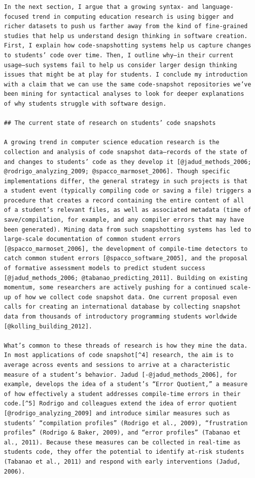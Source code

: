 \begin{verbatim}
In the next section, I argue that a growing syntax- and language-focused trend in computing education research is using bigger and richer datasets to push us farther away from the kind of fine-grained studies that help us understand design thinking in software creation. First, I explain how code-snapshotting systems help us capture changes to students’ code over time. Then, I outline why—in their current usage—such systems fail to help us consider larger design thinking issues that might be at play for students. I conclude my introduction with a claim that we can use the same code-snapshot repositories we’ve been mining for syntactical analyses to look for deeper explanations of why students struggle with software design.

## The current state of research on students’ code snapshots

A growing trend in computer science education research is the collection and analysis of code snapshot data—records of the state of and changes to students’ code as they develop it [@jadud_methods_2006; @rodrigo_analyzing_2009; @spacco_marmoset_2006]. Though specific implementations differ, the general strategy in such projects is that a student event (typically compiling code or saving a file) triggers a procedure that creates a record containing the entire content of all of a student’s relevant files, as well as associated metadata (time of save/compilation, for example, and any compiler errors that may have been generated). Mining data from such snapshotting systems has led to large-scale documentation of common student errors [@spacco_marmoset_2006], the development of compile-time detectors to catch common student errors [@spacco_software_2005], and the proposal of formative assessment models to predict student success [@jadud_methods_2006; @tabanao_predicting_2011]. Building on existing momentum, some researchers are actively pushing for a continued scale-up of how we collect code snapshot data. One current proposal even calls for creating an international database by collecting snapshot data from thousands of introductory programming students worldwide [@kolling_building_2012].

What’s common to these threads of research is how they mine the data. In most applications of code snapshot[^4] research, the aim is to average across events and sessions to arrive at a characteristic measure of a student’s behavior. Jadud [-@jadud_methods_2006], for example, develops the idea of a student’s “Error Quotient,” a measure of how effectively a student addresses compile-time errors in their code.[^5] Rodrigo and colleagues extend the idea of error quotient [@rodrigo_analyzing_2009] and introduce similar measures such as students’ “compilation profiles” (Rodrigo et al., 2009), “frustration profiles” (Rodrigo & Baker, 2009), and “error profiles” (Tabanao et al., 2011). Because these measures can be collected in real-time as students code, they offer the potential to identify at-risk students (Tabanao et al., 2011) and respond with early interventions (Jadud, 2006).


\end{verbatim}
